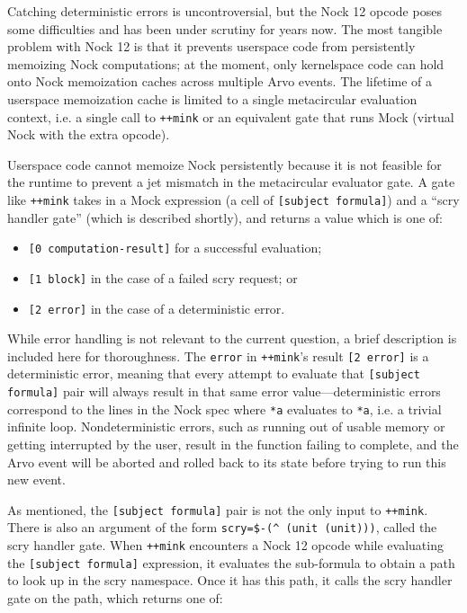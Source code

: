 \documentclass[twoside]{article}
\begin{document}
Catching deterministic errors is uncontroversial, but the Nock 12 opcode poses some difficulties and has been under scrutiny for years now.  The most tangible problem with Nock 12 is that it prevents userspace code from persistently memoizing Nock computations; at the moment, only kernelspace code can hold onto Nock memoization caches across multiple Arvo events.  The lifetime of a userspace memoization cache is limited to a single metacircular evaluation context, i.e. a single call to \lstinline[style=inlinecode]{++mink} or an equivalent gate that runs Mock (virtual Nock with the extra opcode).

Userspace code cannot memoize Nock persistently because it is not feasible for the runtime to prevent a jet mismatch in the metacircular evaluator gate.  A gate like \lstinline[style=inlinecode]{++mink} takes in a Mock expression (a cell of \lstinline[style=inlinecode]{[subject formula]}) and a “scry handler gate” (which is described shortly), and returns a value which is one of:

\begin{itemize}
  \item  \lstinline[style=inlinecode]{[0 computation-result]} for a successful evaluation;
  \item  \lstinline[style=inlinecode]{[1 block]} in the case of a failed scry request; or
  \item  \lstinline[style=inlinecode]{[2 error]} in the case of a deterministic error.
\end{itemize}

\noindent
While error handling is not relevant to the current question, a brief description is included here for thoroughness.  The \lstinline[style=inlinecode]{error} in \lstinline[style=inlinecode]{++mink}'s result \lstinline[style=inlinecode]{[2 error]} is a deterministic error, meaning that every attempt to evaluate that \lstinline[style=inlinecode]{[subject formula]} pair will always result in that same error value—deterministic errors correspond to the lines in the Nock spec where \lstinline[style=inlinecode]{*a} evaluates to \lstinline[style=inlinecode]{*a}, i.e. a trivial infinite loop.  Nondeterministic errors, such as running out of usable memory or getting interrupted by the user, result in the function failing to complete, and the Arvo event will be aborted and rolled back to its state before trying to run this new event.

As mentioned, the \lstinline[style=inlinecode]{[subject formula]} pair is not the only input to \lstinline[style=inlinecode]{++mink}.  There is also an argument of the form \lstinline[style=inlinecode]{scry=$-(^ (unit (unit)))}, called the scry handler gate.  When \lstinline[style=inlinecode]{++mink} encounters a Nock 12 opcode while evaluating the \lstinline[style=inlinecode]{[subject formula]} expression, it evaluates the sub-formula to obtain a path to look up in the scry namespace.  Once it has this path, it calls the scry handler gate on the path, which returns one of:
\end{document}
